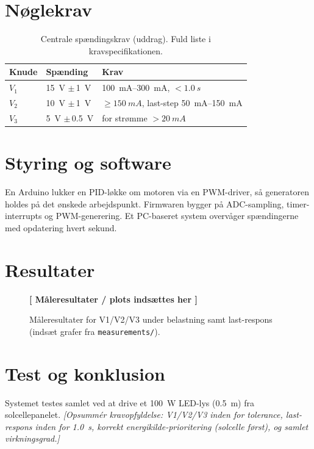 \documentclass[
     title     = {{Elektrisk Energisystem}}
    ,subject   = {{62768 Electrical Energy Systems -- Projekt · DTU · Juni 2026}}
    ,papersize = {{a0paper}}
    ,colcount  = {{3columns}}
    ,highlight = dtured
    ,largecaption
]{dtuposter}
\begin{document}
\begin{dtupostercontent}
\section{Nøglekrav}
\begin{table}
\caption{Centrale spændingskrav (uddrag). Fuld liste i kravspecifikationen.}
\label{tab:krav}
\begin{tabular}{lll}
\toprule
\textbf{Knude} & \textbf{Spænding} & \textbf{Krav} \\
\midrule
$V_1$ & \SI{15}{V} $\pm$\,\SI{1}{V}   & \SIrange{100}{300}{mA}, $<\SI{1.0}{s}$ \\
$V_2$ & \SI{10}{V} $\pm$\,\SI{1}{V}   & $\geq\SI{150}{mA}$, last-step \SIrange{50}{150}{mA} \\
$V_3$ & \SI{5}{V}  $\pm$\,\SI{0.5}{V} & for strømme $>\SI{20}{mA}$ \\
\bottomrule
\end{tabular}
\end{table}

\section{Styring og software}
En Arduino lukker en PID-løkke om motoren via en PWM-driver, så generatoren holdes
på det ønskede arbejdspunkt. Firmwaren bygger på ADC-sampling, timer-interrupts og
PWM-generering. Et PC-baseret system overvåger spændingerne med opdatering hvert
sekund.

\section{Resultater}
\begin{figure}
  \begin{fadebox}\begin{center}
    \vspace{6cm}
    \textbf{[ Måleresultater / plots indsættes her ]}
    \vspace{6cm}
  \end{center}\end{fadebox}
  \caption{Måleresultater for V1/V2/V3 under belastning samt last-respons
  (indsæt grafer fra \texttt{measurements/}).}
  \label{fig:resultater}
\end{figure}

\section{Test og konklusion}
Systemet testes samlet ved at drive et \SI{100}{W} LED-lys (\SI{0.5}{m}) fra
solcellepanelet. \emph{[Opsummér kravopfyldelse: V1/V2/V3 inden for tolerance,
last-respons inden for \SI{1.0}{s}, korrekt energikilde-prioritering (solcelle
først), og samlet virkningsgrad.]}

\end{dtupostercontent}
\end{document}
